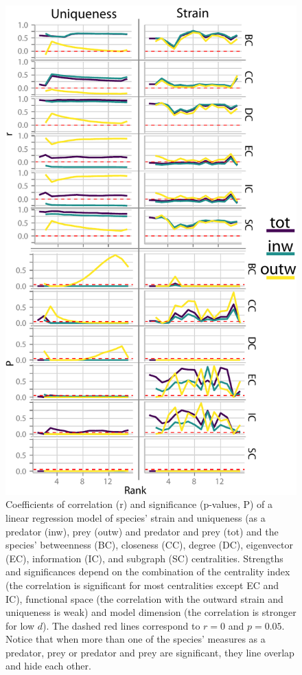\documentclass[]{rsos}%
\begin{document}
\begin{figure}[hbt]
 \centering
 \includegraphics[height=0.6\textheight]{./images/chap_2/Figure_4.pdf}
 \caption{Coefficients of correlation (r) and significance (p-values, P) of a linear regression model
 of species' strain and uniqueness
(as a predator (inw), prey (outw) and predator and prey (tot)
and the species' betweenness (BC), closeness (CC), degree (DC),
eigenvector (EC), information (IC), and subgraph (SC)
centralities. Strengths and significances depend on the combination
of the centrality index (the correlation is significant for most centralities
except EC and IC), functional space (the correlation with the outward strain
and uniqueness is weak) and model dimension (the correlation is stronger
for low $d$). The dashed red lines correspond to $r = 0$ and $p = 0.05$. Notice that when more than
one of the species' measures as a predator, prey or predator and prey are significant, they line overlap
and hide each other.}\label{fig:strain_4}
\end{figure}
\end{document}
